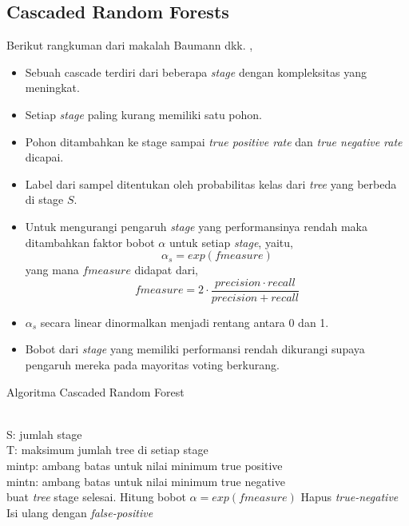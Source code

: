 \subsection{Cascaded Random Forests}

Berikut rangkuman dari makalah Baumann dkk. \cite{baumann2013cascaded},

\begin{itemize}
\item Sebuah cascade terdiri dari beberapa \textit{stage} dengan kompleksitas
yang meningkat.
\item Setiap \textit{stage} paling kurang memiliki satu pohon.
\item Pohon ditambahkan ke stage sampai \textit{true positive rate} dan
\textit{true negative rate} dicapai.
\item Label dari sampel ditentukan oleh probabilitas kelas dari \textit{tree}
yang berbeda di stage $S$.
\item Untuk mengurangi pengaruh \textit{stage} yang performansinya rendah maka
ditambahkan faktor bobot $\alpha$ untuk setiap \textit{stage}, yaitu,
\[
	\alpha_{s} = exp(fmeasure)
\]
yang mana $fmeasure$ didapat dari,
\[
	fmeasure = 2 \cdot \frac{precision \cdot recall}{precision + recall}
\]
\item $\alpha_{s}$ secara linear dinormalkan menjadi rentang antara 0 dan 1.
\item Bobot dari \textit{stage} yang memiliki performansi rendah dikurangi
supaya pengaruh mereka pada mayoritas voting berkurang.
\end{itemize}

\begin{algorithm}[t!]
\caption{Algoritma Cascaded Random Forest}
\label{alg:cascadedrf}
\begin{algorithmic}
	\Require \\
	S: jumlah stage \\
	T: maksimum jumlah tree di setiap stage \\
	mintp: ambang batas untuk nilai minimum true positive \\
	mintn: ambang batas untuk nilai minimum true negative \\
				\State buat \textit{tree}
					\State stage selesai.
				\EndIf
			\EndFor
			\State Hitung bobot $ \alpha = exp(fmeasure) $
			\State Hapus \textit{true-negative}
			\State Isi ulang dengan \textit{false-positive}
		\EndFor
	\EndFunction
\end{algorithmic}
\end{algorithm}

